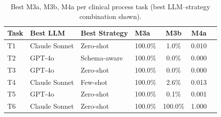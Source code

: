 \begin{table}[t]
  \caption{Best M3a, M3b, M4a per clinical process task (best LLM--strategy combination shown).}\label{tab:pertask}
  \centering
  \begin{tabular}{@{}llllccc@{}}
    \toprule
    \textbf{Task} & \textbf{Best LLM} & \textbf{Best Strategy} & \textbf{M3a} & \textbf{M3b} & \textbf{M4a} \\
    \midrule
    T1 & Claude Sonnet & Zero-shot & \cellcolor{green!20}100.0\% & \cellcolor{red!20}1.0\% & \cellcolor{red!20}0.010 \\
    T2 & GPT-4o & Schema-aware & \cellcolor{green!20}100.0\% & \cellcolor{red!20}0.0\% & \cellcolor{red!20}0.000 \\
    T3 & GPT-4o & Zero-shot & \cellcolor{green!20}100.0\% & \cellcolor{red!20}0.0\% & \cellcolor{red!20}0.000 \\
    T4 & Claude Sonnet & Few-shot & \cellcolor{green!20}100.0\% & \cellcolor{red!20}2.6\% & \cellcolor{red!20}0.013 \\
    T5 & GPT-4o & Zero-shot & \cellcolor{green!20}100.0\% & \cellcolor{red!20}0.1\% & \cellcolor{red!20}0.001 \\
    T6 & Claude Sonnet & Zero-shot & \cellcolor{green!20}100.0\% & \cellcolor{green!20}100.0\% & \cellcolor{green!20}1.000 \\
    \bottomrule
  \end{tabular}
\end{table}

